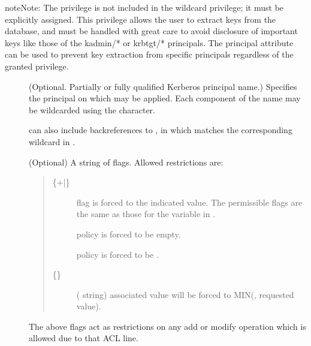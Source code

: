 \documentclass[letterpaper,10pt,english]{sphinxmanual}
\begin{document}
\begin{sphinxadmonition}{note}{Note:}
\sphinxAtStartPar
The  privilege is not included in the wildcard
privilege; it must be explicitly assigned.  This privilege
allows the user to extract keys from the database, and must be
handled with great care to avoid disclosure of important keys
like those of the kadmin/* or krbtgt/* principals.  The
 principal attribute can be used to prevent
key extraction from specific principals regardless of the
granted privilege.
\end{sphinxadmonition}
\begin{description}
\item[{}] \leavevmode
\sphinxAtStartPar
(Optional. Partially or fully qualified Kerberos principal name.)
Specifies the principal on which  may be applied.
Each component of the name may be wildcarded using the \sphinxcode{\sphinxupquote{*}}
character.

\sphinxAtStartPar
{} can also include back\sphinxhyphen{}references to ,
in which  matches the corresponding wildcard in
.

\item[{}] \leavevmode
\sphinxAtStartPar
(Optional) A string of flags. Allowed restrictions are:
\begin{quote}
\begin{description}
\item[{\{+|\sphinxhyphen{}\}}] \leavevmode
\sphinxAtStartPar
flag is forced to the indicated value.  The permissible flags
are the same as those for the 
variable in {\hyperref[\detokenize{admin/conf_files/kdc_conf:kdc-conf-5}]{}}.

\item[{}] \leavevmode
\sphinxAtStartPar
policy is forced to be empty.

\item[{}] \leavevmode
\sphinxAtStartPar
policy is forced to be .

\item[{\sphinxhyphen{}\{\} }] \leavevmode
\sphinxAtStartPar
( string) associated value will be forced to
MIN(, requested value).

\end{description}
\end{quote}

\sphinxAtStartPar
The above flags act as restrictions on any add or modify operation
which is allowed due to that ACL line.

\end{description}
\end{document}
